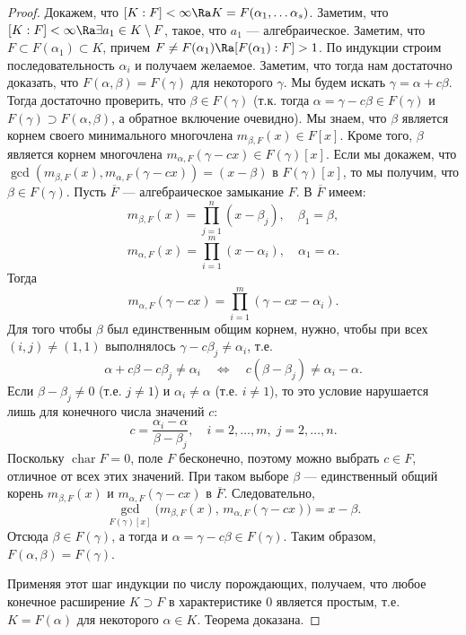 \begin{proof}
    Докажем, что \([K:F] < \infty \Ra K = F(\alpha_1, \dots \alpha_s)\). Заметим, что \([K:F] < \infty \Ra \exists a_1 \in K \setminus F\), такое, что \(a_1\) --- алгебраическое. Заметим, что \(F \subset F(\alpha_1) \subset K\), причем \(F \ne F(\alpha_1) \Ra [F(\alpha_1):F] > 1\). По индукции строим последовательность \(\alpha_i\) и получаем желаемое. Заметим, что тогда нам достаточно доказать, что \(F(\alpha, \beta) = F(\gamma)\) для некоторого \(\gamma\). Мы будем искать \(\gamma = \alpha + c\beta\). Тогда достаточно проверить, что \(\beta \in F(\gamma)\) (т.к. тогда \(\alpha = \gamma - c\beta \in F(\gamma)\) и \(F(\gamma) \supset F(\alpha, \beta)\), а обратное включение очевидно). Мы знаем, что \(\beta\) является корнем своего минимального многочлена \(m_{\beta, F}(x) \in F[x]\). Кроме того, \(\beta\) является корнем многочлена \(m_{\alpha, F}(\gamma - cx) \in F(\gamma)[x]\). Если мы докажем, что \(\gcd(m_{\beta, F}(x), m_{\alpha, F}(\gamma - cx)) = (x - \beta)\) в \(F(\gamma)[x]\), то мы получим, что \(\beta \in F(\gamma)\). 
    Пусть \(\overline{F}\) — алгебраическое замыкание \(F\). В \(\overline{F}\) имеем:
    \[
    m_{\beta,F}(x) = \prod_{j=1}^{n} (x - \beta_j), \quad \beta_1 = \beta,
    \]
    \[
    m_{\alpha,F}(x) = \prod_{i=1}^{m} (x - \alpha_i), \quad \alpha_1 = \alpha.
    \]
    Тогда
    \[
    m_{\alpha,F}(\gamma - c x) = \prod_{i=1}^{m} (\gamma - c x - \alpha_i).
    \]
    Для того чтобы \(\beta\) был единственным общим корнем, нужно, чтобы при всех \((i,j) \ne (1,1)\) выполнялось \(\gamma - c\beta_j \ne \alpha_i\), т.е.
    \[
    \alpha + c\beta - c\beta_j \ne \alpha_i \quad\Longleftrightarrow\quad c(\beta - \beta_j) \ne \alpha_i - \alpha.
    \]
    Если \(\beta - \beta_j \ne 0\) (т.е. \(j \ne 1\)) и \(\alpha_i \ne \alpha\) (т.е. \(i \ne 1\)), то это условие нарушается лишь для конечного числа значений \(c\):
    \[
    c = \frac{\alpha_i - \alpha}{\beta - \beta_j}, \quad i = 2,\dots,m,\; j = 2,\dots,n.
    \]
    Поскольку \(\operatorname{char} F = 0\), поле \(F\) бесконечно, поэтому можно выбрать \(c \in F\), отличное от всех этих значений. При таком выборе \(\beta\) — единственный общий корень \(m_{\beta,F}(x)\) и \(m_{\alpha,F}(\gamma - cx)\) в \(\overline{F}\). Следовательно,
    \[
    \gcd_{F(\gamma)[x]}\bigl(m_{\beta,F}(x),\, m_{\alpha,F}(\gamma - cx)\bigr) = x - \beta.
    \]
    Отсюда \(\beta \in F(\gamma)\), а тогда и \(\alpha = \gamma - c\beta \in F(\gamma)\). Таким образом, \(F(\alpha,\beta) = F(\gamma)\).

    Применяя этот шаг индукции по числу порождающих, получаем, что любое конечное расширение \(K \supset F\) в характеристике 0 является простым, т.е. \(K = F(\alpha)\) для некоторого \(\alpha \in K\). Теорема доказана.
\end{proof}

